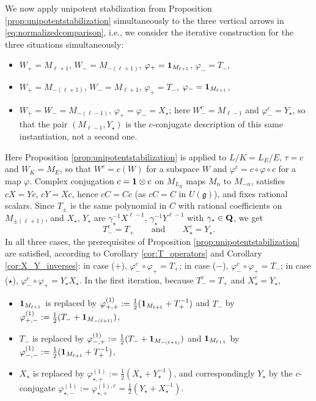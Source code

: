 \documentclass[a4paper,12pt,reqno]{amsart}
\newcommand{\QQ}{{\rm\bf Q}}
\theoremstyle{plain}
\theoremstyle{remark}
\begin{document}
    We now apply unipotent stabilization from Proposition \ref{prop:unipotentstabilization} simultaneously to the three vertical arrows in \eqref{eq:normalizedcomparison}, i.e., we consider the iterative construction for the three situations simultaneously:
    \begin{itemize}
    \item[($+$)] $W_+=M_{\ell+1}$, $W_-=M_{-(\ell+1)}$, $\varphi_+={\bf1}_{M_{\ell+1}}$, $\varphi_-=T_-$,
    \item[($-$)] $W_+=M_{-(\ell+1)}$, $W_-=M_{\ell+1}$, $\varphi_+=T_-$, $\varphi_-={\bf1}_{M_{\ell+1}}$,
    \item[($\star$)] $W_+=W_-=M_{-(\ell-1)}$, $\varphi_+=\varphi_-=X_\star$; here $W_-^c=M_{\ell-1}$ and $\varphi_-^c=Y_\star$, so that the pair $(M_{\ell-1},Y_\star)$ is the $c$-conjugate description of this same instantiation, not a second one.
    \end{itemize}
    Here Proposition \ref{prop:unipotentstabilization} is applied to $L/K=L_E/E$, $\tau=c$ and $W_K=M_E$, so that $W^c=c(W)$ for a subspace $W$ and $\varphi^c=c\circ\varphi\circ c$ for a map $\varphi$. Complex conjugation $c={\bf1}\otimes c$ on $M_{L_E}$ maps $M_n$ to $M_{-n}$, satisfies $cX=Yc$, $cY=Xc$, hence $cC=Cc$ (as $cC=C$ in $U(\mathfrak{g})$), and fixes rational scalars. Since $T_\pm$ is the same polynomial in $C$ with rational coefficients on $M_{\pm(\ell+1)}$, and $X_\star$, $Y_\star$ are $\gamma_\star^{-1}X^{\ell-1}$, $\gamma_\star^{-1}Y^{\ell-1}$ with $\gamma_\star\in\QQ$, we get
    \[
      T_-^c=T_+\qquad\text{and}\qquad X_\star^c=Y_\star.
    \]
    In all three cases, the prerequisites of Proposition \ref{prop:unipotentstabilization} are satisfied, according to Corollary \ref{cor:T_operators} and Corollary \ref{cor:X_Y_inverses}: in case ($+$), $\varphi_-^c\circ\varphi_+=T_+$; in case ($-$), $\varphi_-^c\circ\varphi_+=T_-$; in case ($\star$), $\varphi_-^c\circ\varphi_+=Y_\star X_\star$. In the first iteration, because $T_-^c=T_+$ and $X_\star^c=Y_\star$,
    \begin{itemize}
      \item ${\bf1}_{M_{\ell+1}}$ is replaced by $\varphi_{+,+}^{(1)}:=\frac{1}{2}({\bf1}_{M_{\ell+1}}+T_+^{-1})$ and $T_-$ by $\varphi_{+,-}^{(1)}:=\frac{1}{2}(T_-+{\bf1}_{M_{-(\ell+1)}})$,
      \item $T_-$ is replaced by $\varphi_{-,+}^{(1)}:=\frac{1}{2}(T_-+{\bf1}_{M_{-(\ell+1)}})$ and ${\bf1}_{M_{\ell+1}}$ by $\varphi_{-,-}^{(1)}:=\frac{1}{2}({\bf1}_{M_{\ell+1}}+T_+^{-1})$,
      \item $X_\star$ is replaced by $\varphi_{\star,+}^{(1)}:=\frac{1}{2}(X_\star+Y_\star^{-1})$, and correspondingly $Y_\star$ by the $c$-conjugate $\varphi_{\star,-}^{(1)}:=\varphi_{\star,+}^{(1),c}=\frac{1}{2}(Y_\star+X_\star^{-1})$.
    \end{itemize}
\end{document}
